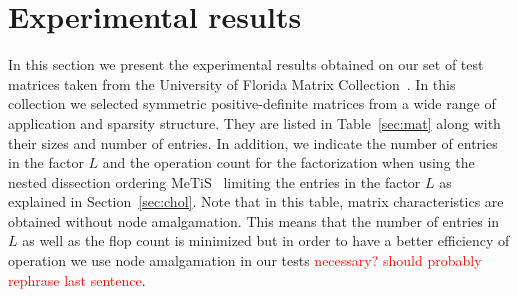 \documentclass{article}
\newcommand{\alert}[1]{\textcolor{red}{#1}\xspace}
\newcommand{\metis}{{\sc Me$\!$T$\!$iS\ }}
\begin{document}
\section{Experimental results}\label{sec:experiments}

In this section we present the experimental results obtained on our
set of test matrices taken from the University of Florida Matrix
Collection~\cite{d.h:11}. In this collection we selected symmetric
positive-definite matrices from a wide range of application and
sparsity structure. They are listed in Table~\ref{sec:mat} along with
their sizes and number of entries. In addition, we indicate the number
of entries in the factor $L$ and the operation count for the
factorization when using the nested dissection ordering \metis
limiting the entries in the factor $L$ as explained in
Section~\ref{sec:chol}. Note that in this table, matrix
characteristics are obtained without node amalgamation. This means
that the number of entries in $L$ as well as the flop count is
minimized but in order to have a better efficiency of operation we use
node amalgamation in our tests \alert{necessary? should probably
  rephrase last sentence}.
\end{document}
